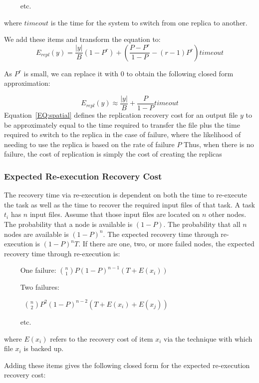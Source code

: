 \documentclass{sig-alternate}
\begin{document}
\noindent ~~~~ etc.

\noindent where $timeout$ is the time for the system to switch from one replica to another.

We add these items and transform the equation to:
\begin{equation}
E_{repl}(y) = \frac{|y|}{B}\left(1-P^r\right) + \left(\frac{P-P^r}{1-P}-(r-1)P^r\right)timeout
\end{equation}

As $P^r$ is small, we can replace it with $0$ to obtain the following closed form approximation:

\begin{equation}
E_{repl}(y) \approx \frac{|y|}{B}+\frac{P}{1-P}timeout
\label{EQ:spatial}
\end{equation}
Equation~\ref{EQ:spatial} defines the replication recovery cost for an output file $y$ to be approximately 
equal to the time required to transfer the file plus the time required to switch to the replica
in the case of failure, where the likelihood of needing to use the replica is based on the rate of failure $P$
Thus, when there is no failure, the cost of replication is simply the cost of creating the replicas

\subsubsection{Expected Re-execution Recovery Cost}
The recovery time via re-execution is dependent on both the time to re-execute the task as well
as the time to recover the required input files of that task. 
A task $t_i$ has $n$ input files. Assume that those input files are located on $n$ other nodes.
The probability that a node is available is $(1-P)$. The probability that all $n$ nodes are available is $(1-P)^n$.
The expected recovery time through re-execution is
$(1-P)^nT$. 
If there are one, two, or more failed nodes, the expected recovery time through re-execution is:

\noindent ~~~~ One failure:
%
${n \choose 1}P(1-P)^{n-1}(T+E(x_i))$

\noindent ~~~~ Two failures:

~~~~~ ${n \choose 2}P^2(1-P)^{n-2}(T+E(x_i)+E(x_j))$

\noindent ~~~~ etc.

\noindent where ${E(x_i)}$ refers to the recovery cost of item ${x_i}$ via the technique with which file ${x_i}$ is backed up. 


Adding these items gives the following closed form for the expected re-execution recovery cost:
\end{document}
